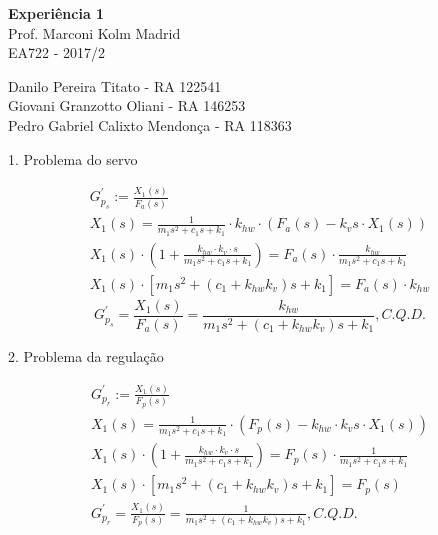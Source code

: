 \documentclass[a4paper,11pt]{article}
\begin{document}
\begin{center}
\textbf{Experiência 1} \\
\hspace{5pt}
Prof. Marconi Kolm Madrid \\
EA722 - 2017/2
\end{center}

\begin{center}
Danilo Pereira Titato - RA 122541 \\
Giovani Granzotto Oliani - RA 146253 \\
Pedro Gabriel Calixto Mendonça - RA 118363 \\
\end{center}

1. Problema do servo

\begin{gather*}
    G^\prime_{p_s} := \frac{X_1 \left( s \right)}{F_a \left( s \right)} \\
    X_{1} \left( s \right) = \frac{1}{m_1s^2 + c_1s + k_1} \cdot k_{hw} \cdot
        \left( F_a \left( s \right) - k_vs \cdot X_1 \left( s \right) \right) \\
    X_{1} \left( s \right) \cdot \left( 1 + \frac{k_{hw} \cdot k_v \cdot s}
        {m_1s^2 + c_1s + k_1} \right) = F_a\left( s \right) \cdot
        \frac{k_{hw}}{m_1s^2 + c_1s + k_1} \\
    X_{1} \left( s \right) \cdot \left[ m_1s^2 + \left( c_1 + k_{hw} k_v \right)
        s + k_1 \right] = F_a\left( s \right) \cdot k_{hw}
\end{gather*}
\begin{equation}
    \label{eq:Gps}
    G^\prime_{p_s} = \frac{X_{1}\left( s \right)}{F_a\left( s \right)} =
        \frac{k_{hw}}{m_1s^2 + \left( c_1 + k_{hw} k_v \right) s + k_1},
        C.Q.D.
\end{equation}

2. Problema da regulação

\begin{gather*}
    G^\prime_{p_r} := \frac{X_1 \left( s \right)}{F_p \left( s \right)} \\
    X_{1} \left( s \right) = \frac{1}{m_1s^2 + c_1s + k_1} \cdot \left(
        F_p\left( s \right) - k_{hw} \cdot k_vs \cdot X_1 \left( s \right)
        \right) \\
    X_{1} \left( s \right) \cdot \left( 1 + \frac{k_{hw} \cdot k_v \cdot s}
        {m_1s^2 + c_1s + k_1} \right) = F_p \left( s \right) \cdot
        \frac{1}{m_1s^2 + c_1s + k_1} \\
    X_{1} \left( s \right) \cdot \left[ m_1s^2 + \left( c_1 + k_{hw} k_v \right)
        s + k_1 \right] = F_p\left( s \right) \\
    G^\prime_{p_r} = \frac{X_{1}\left( s \right)}{F_p\left( s \right)} =
        \frac{1}{m_1s^2 + \left( c_1 + k_{hw} k_v \right) s + k_1}, C.Q.D.
\end{gather*}
\end{document}
